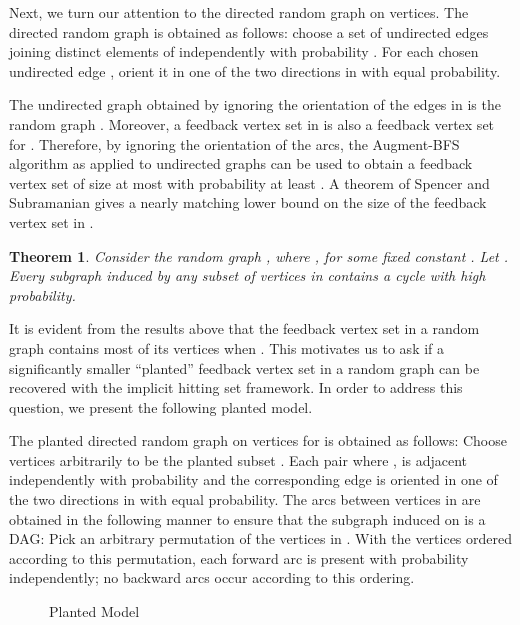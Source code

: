 \documentclass[11pt]{article}
\newtheorem{theorem}{Theorem}
\begin{document}
Next, we turn our attention to the directed random graph  on  vertices. The directed random graph  is obtained as follows: choose a set of undirected edges joining distinct elements of  independently with probability . For each chosen undirected edge , orient it in one of the two directions  in  with equal probability.

The undirected graph  obtained by ignoring the orientation of the edges in  is the random graph . Moreover, a feedback vertex set in  is also a feedback vertex set for . Therefore, by ignoring the orientation of the arcs, the Augment-BFS algorithm as applied to undirected graphs can be used to obtain a feedback vertex set of size at most  with probability at least . A theorem of Spencer and Subramanian \cite{spencer-subramanian} gives a nearly matching lower bound on the size of the feedback vertex set in .
\begin{theorem}\cite{spencer-subramanian}\label{theorem:directed-FVSlowerbound}
Consider the random graph , where , for some fixed constant . Let . Every subgraph induced by any subset of  vertices in  contains a cycle with high probability.
\end{theorem}

It is evident from the results above that the feedback vertex set in a random graph contains most of its vertices when . This motivates us to ask if a significantly smaller ``planted'' feedback vertex set in a random graph can be recovered with the implicit hitting set framework. In order to address this question, we present the following planted model.

The planted directed random graph  on  vertices for  is obtained as follows: Choose  vertices arbitrarily to be the planted subset . Each pair  where , is adjacent independently with probability  and the corresponding edge is oriented in one of the two directions  in  with equal probability. The arcs between vertices in  are obtained in the following manner to ensure that the subgraph induced on  is a DAG: Pick an arbitrary permutation of the vertices in . With the vertices ordered according to this permutation, each forward arc is present with probability  independently; no backward arcs occur according to this ordering.

\begin{figure}[H]
\label{fig:planted-model}
\begin{center}
\end{center}
\caption{Planted Model}
\end{figure}
\end{document}
